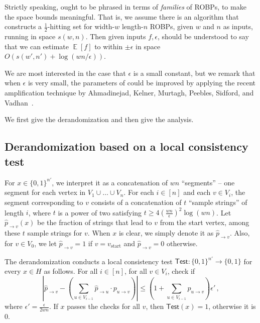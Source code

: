 \documentclass{toc}
\DeclareMathOperator*{\ExpVal}{\mathbb{E}}
\begin{document}
Strictly speaking,  ought to be phrased in terms of \emph{families} of ROBPs, to make the space bounds meaningful. That is, we assume there is an algorithm that constructs a $\frac{1}{2}$-hitting set for width-$w$ length-$n$ ROBPs, given $w$ and $n$ as inputs, running in space $s(w, n)$. Then given inputs $f, \epsilon$,  should be understood to say that we can estimate $\ExpVal[f]$ to within $\pm \epsilon$ in space $O(s(w', n') + \log(wn/\epsilon))$.

We are most interested in the case that $\epsilon$ is a small constant, but we remark that when $\epsilon$ is very small, the parameters of  could be improved by applying the recent amplification technique by Ahmadinejad, Kelner, Murtagh, Peebles, Sidford, and Vadhan~\cite{AKMPSV20}.

We first give the derandomization and then give the analysis.

\subsection{Derandomization based on a local consistency test} 
\label{subsec:drandBPLgivenHS}

For $x\in \{0,1\}^{n'}$, we interpret it as a concatenation of $wn$ ``segments'' -- one segment for each vertex in $V_1 \cup \dots \cup V_n$. For each $i \in [n]$ and each $v \in V_i$, the segment corresponding to $v$ consists of a concatenation of $t$ ``sample strings'' of length $i$, where $t$ is a power of two satisfying $t \geq 4(\frac{wn }{\epsilon})^2 \log (wn)$. Let $\widehat{p}_{\to v}(x)$ be the fraction of strings that lead to $v$ from the start vertex, among  these $t$ sample strings for $v$. When $x$ is clear, we simply denote it as $\widehat{p}_{\to v}$. Also, for $v \in V_0$, we let $\widehat{p}_{\to v} = 1$ if $v = v_{\text{start}}$ and $\widehat{p}_{\to v} = 0$ otherwise.

The derandomization conducts a local consistency test $\mathsf{Test}:\{0,1\}^{n'} \to \{0,1\}$ for every $x \in H$ as follows. 
For all $i \in [n]$, for all $v \in V_i$,  check if 
\begin{equation} \label{ieq:lct}
\left|\widehat{p}_{\to v} -\left(  \sum_{u \in V_{i-1} } \widehat{p}_{\to u} \cdot p_{u \to v}  \right) \right| \leq \left( 1 + \sum_{u\in V_{i-1}}p_{u\to v} \right) \epsilon'\,,
\end{equation}   
where $\epsilon' = \frac{\epsilon}{2wn}$. If $x$ passes the checks for all $v$, then $\mathsf{Test}(x) = 1$, otherwise it is $0$.
\end{document}
